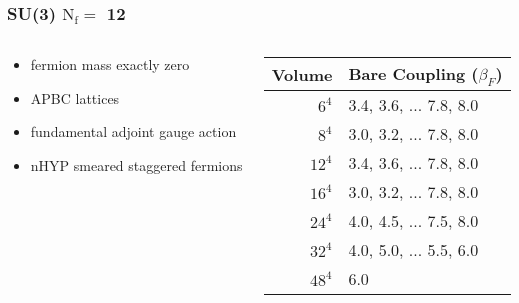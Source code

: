 \begin{frame}
  \frametitle{SU(3) $\text{N}_{\text{f}}=$ 12}
  \begin{columns}[c]
    \begin{column}{0.5\textwidth}
      \begin{itemize}
        \item fermion mass exactly zero
        \item APBC lattices
        \item fundamental adjoint gauge action
        \item nHYP smeared staggered fermions
      \end{itemize}
    \end{column}
    \begin{column}{0.5\textwidth}
      \begin{tabular}{| r | l |}\hline
        Volume & Bare Coupling ($\beta_F$) \\\hline
        $6^4$  & 3.4, 3.6, ... 7.8, 8.0 \\
        $8^4$  & 3.0, 3.2, ... 7.8, 8.0 \\
        $12^4$ & 3.4, 3.6, ... 7.8, 8.0 \\
        $16^4$ & 3.0, 3.2, ... 7.8, 8.0 \\
        $24^4$ & 4.0, 4.5, ... 7.5, 8.0 \\
        $32^4$ & 4.0, 5.0, ... 5.5, 6.0 \\
        $48^4$ & 6.0 \\ \hline
      \end{tabular}
    \end{column}
  \end{columns}
\end{frame}

